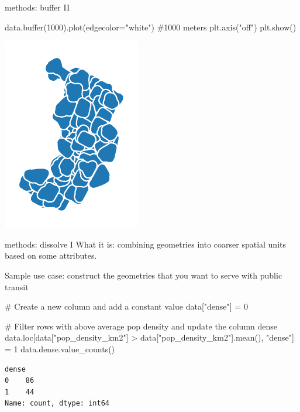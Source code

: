 \documentclass[
  ignorenonframetext,
]{beamer}
\newenvironment{Shaded}{\begin{snugshade}}{\end{snugshade}}
\newcommand{\BuiltInTok}[1]{\textcolor[rgb]{0.00,0.23,0.31}{#1}}
\newcommand{\CommentTok}[1]{\textcolor[rgb]{0.37,0.37,0.37}{#1}}
\newcommand{\DecValTok}[1]{\textcolor[rgb]{0.68,0.00,0.00}{#1}}
\newcommand{\NormalTok}[1]{\textcolor[rgb]{0.00,0.23,0.31}{#1}}
\newcommand{\OperatorTok}[1]{\textcolor[rgb]{0.37,0.37,0.37}{#1}}
\newcommand{\StringTok}[1]{\textcolor[rgb]{0.13,0.47,0.30}{#1}}
\begin{document}
\begin{frame}[fragile]{methods: buffer II}
\label{methods-buffer-ii}
\begin{Shaded}
\begin{Highlighting}[]
\NormalTok{data.}\BuiltInTok{buffer}\NormalTok{(}\DecValTok{1000}\NormalTok{).plot(edgecolor}\OperatorTok{=}\StringTok{"white"}\NormalTok{) }\CommentTok{\#1000 meters}
\NormalTok{plt.axis(}\StringTok{"off"}\NormalTok{)}
\NormalTok{plt.show()}
\end{Highlighting}
\end{Shaded}

\includegraphics{spatial_2_files/figure-beamer/cell-23-output-1.pdf}
\end{frame}

\begin{frame}[fragile]{methods: dissolve I}
\label{methods-dissolve-i}
What it is: combining geometries into coarser spatial units based on
some attributes.

Sample use case: construct the geometries that you want to serve with
public transit

\begin{Shaded}
\begin{Highlighting}[]
\CommentTok{\# Create a new column and add a constant value}
\NormalTok{data[}\StringTok{"dense"}\NormalTok{] }\OperatorTok{=} \DecValTok{0}

\CommentTok{\# Filter rows with above average pop density and update the column dense}
\NormalTok{data.loc[data[}\StringTok{"pop\_density\_km2"}\NormalTok{] }\OperatorTok{\textgreater{}}\NormalTok{ data[}\StringTok{"pop\_density\_km2"}\NormalTok{].mean(), }\StringTok{"dense"}\NormalTok{] }\OperatorTok{=} \DecValTok{1}
\NormalTok{data.dense.value\_counts()}
\end{Highlighting}
\end{Shaded}

\begin{verbatim}
dense
0    86
1    44
Name: count, dtype: int64
\end{verbatim}
\end{frame}
\end{document}
